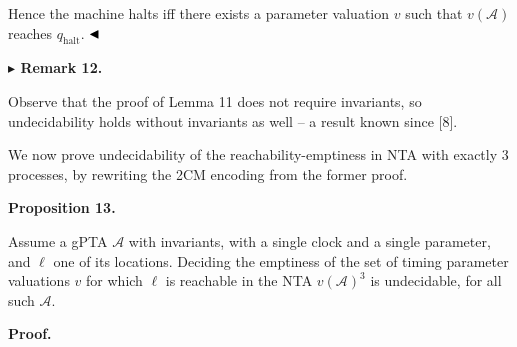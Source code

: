 \documentclass[10pt,a4paper]{article}
\begin{document}
 
  
 
  
Hence the machine halts iff there exists a parameter valuation $v$ such that $v(\mathcal{A})$ reaches $q_{\textrm{halt}}$. $\hfill\blacktriangleleft$\par
 
 
 
\par\medskip\noindent\textbf{$\blacktriangleright$ Remark 12.}\par
 
 
Observe that the proof of Lemma 11 does not require invariants, so undecidability holds without invariants as well -- a result known since [8].\par
 
 
 
 
We now prove undecidability of the reachability-emptiness in NTA with exactly 3 processes, by rewriting the 2CM encoding from the former proof.\par
 
 
 
\par\medskip\noindent\textbf{Proposition 13.}\par
 
 
Assume a gPTA $\mathcal{A}$ with invariants, with a single clock and a single parameter, and $\mathrm{\ell}$ one of its locations. Deciding the emptiness of the set of timing parameter valuations $v$ for which $\mathrm{\ell}$ is reachable in the NTA ${v(\mathcal{A})}^{3}$ is undecidable, for all such $\mathcal{A}$.\par
 
 
 
 
 
\par\medskip\noindent\textbf{Proof.}\par
 
\end{document}
